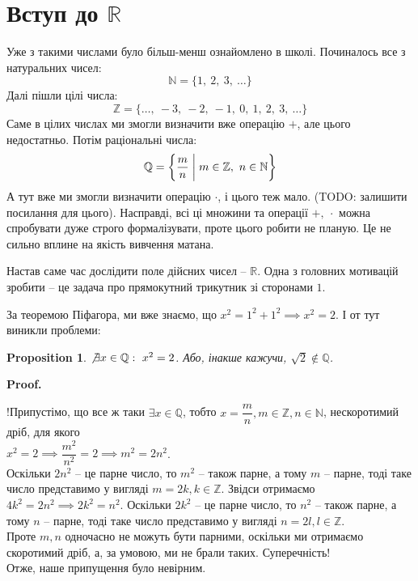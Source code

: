 \documentclass[a4paper, 14pt]{article}
\makeatletter
\def\qed{$\blacksquare$}
\theoremstyle{theoremdd}
\theoremstyle{theoremdd}
\theoremstyle{theoremdd}
\theoremstyle{theoremdd}
\theoremstyle{theoremdd}
\newtheorem{proposition}[theorem]{Proposition}
\theoremstyle{theoremdd}
\theoremstyle{theoremdd}
\theoremstyle{theoremdd}
\renewenvironment{proof}[1][Proof.\\]{\par
\pushQED{\hfill \qed}%
\normalfont \topsep6\p@\@plus6\p@\relax
\trivlist
\item\relax
{\bfseries
#1\@addpunct{.}}\hspace\labelsep\ignorespaces
}{%
\popQED\endtrivlist\@endpefalse
}
\makeatother
\begin{document}

\tableofcontents
\newpage

	\section{Вступ до $\mathbb{R}$}
	Уже з такими числами було більш-менш ознайомлено в школі. Починалось все з натуральних чисел:	
	$$ \mathbb{N} = \{1, \ 2, \ 3, \ \dots\} $$
	Далі пішли цілі  числа: \\
	$$ \mathbb{Z} = \{\dots,\ -3 ,\ -2, \ -1,\ 0,\ 1,\ 2,\ 3,\ \dots\} $$
	Саме в цілих числах ми змогли визначити вже операцію $+$, але цього недостатньо. Потім раціональні числа: \\
	$$ \mathbb{Q} = \left\{ \dfrac{m}{n} \biggm| m \in \mathbb{Z},\ n \in \mathbb{N} \right\} $$
	А тут вже ми змогли визначити операцію $\cdot$, і цього теж мало. (TODO: залишити посилання для цього). Насправді, всі ці множини та операції $+,\ \cdot$ можна спробувати дуже строго формалізувати, проте цього робити не планую. Це не сильно вплине на якість вивчення матана.
	
	Настав саме час дослідити поле дійсних чисел -- $\mathbb{R}$. Одна з головних мотивацій зробити -- це задача про прямокутний трикутник зі сторонами $1$.
	\begin{figure}[H]
	\centering
	\end{figure}
	За теоремою Піфагора, ми вже знаємо, що
	$x^2 = 1^2 + 1^2 \implies x^2 = 2$. І от тут виникли проблеми:
	\begin{proposition}
	$\not\exists  x \in \mathbb{Q}: \ x^2 = 2$. Або, інакше кажучи, $\sqrt{2} \notin \mathbb{Q}$.
	\end{proposition}
	
	\begin{proof}
	!Припустімо, що все ж таки $\exists x \in \mathbb{Q}$, тобто $x= \dfrac{m}{n}, m \in \mathbb{Z}, n \in \mathbb{N}$, нескоротимий дріб, для якого\\
	$x^2 = 2 \implies \dfrac{m^2}{n^2} = 2 \implies m^2 = 2n^2$.\\
	Оскільки $2n^2$ -- це парне число, то $m^2$ -- також парне, а тому $m$ -- парне, тоді таке число представимо у вигляді $m = 2k, k \in \mathbb{Z}$. Звідси отримаємо $4k^2 = 2n^2 \implies 2k^2 = n^2$.
	Оскільки $2k^2$ -- це парне число, то $n^2$ -- також парне, а тому $n$ -- парне, тоді таке число представимо у вигляді $n = 2l, l \in \mathbb{Z}$.\\
	Проте $m,n$ одночасно не можуть бути парними, оскільки ми отримаємо скоротимий дріб, а, за умовою, ми не брали таких. Суперечність!\\
	Отже, наше припущення було невірним.
	\end{proof}
	
\end{document}
